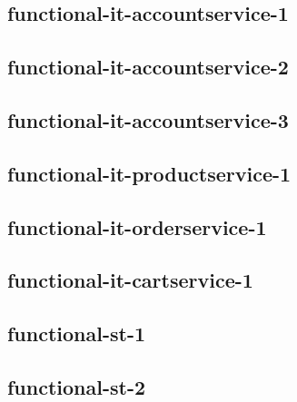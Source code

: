 \subsection{functional-it-accountservice-1}
\ttfamily
\begingroup
\obeylines
%
\endgroup%

\subsection{functional-it-accountservice-2}
\begingroup
\obeylines
%
\endgroup%

\subsection{functional-it-accountservice-3}
\begingroup
\obeylines
%
\endgroup%

\subsection{functional-it-productservice-1}
\begingroup
\obeylines
%
\endgroup%

\subsection{functional-it-orderservice-1}
\begingroup
\obeylines
%
\endgroup%

\subsection{functional-it-cartservice-1}
\begingroup
\obeylines
%
\endgroup%

\subsection{functional-st-1}
\begingroup
\obeylines
%
\endgroup%

\subsection{functional-st-2}
\begingroup
\obeylines
%
\endgroup%

